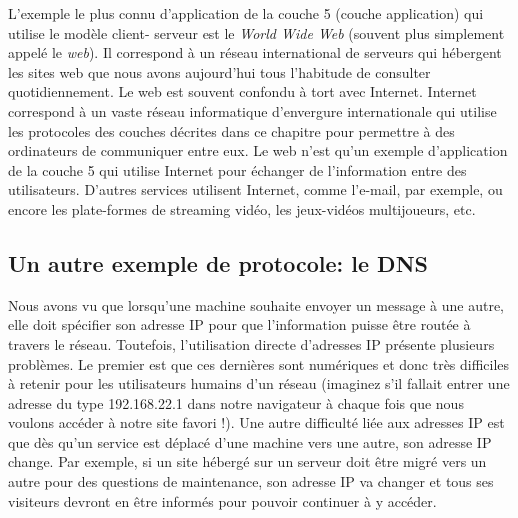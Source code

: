 \documentclass[11pt, a4paper]{book}
\begin{document}
\vskip1cm

L'exemple le plus connu d'application de la couche 5 (couche application) qui utilise le modèle client-
serveur est le {\it World Wide Web} (souvent plus simplement appelé le {\it web}). Il correspond à un réseau international de serveurs qui hébergent les sites web que nous avons aujourd'hui tous l'habitude de consulter quotidiennement. Le web est souvent confondu à tort avec Internet. Internet correspond à un vaste réseau informatique d'envergure internationale qui utilise les protocoles des couches décrites dans ce chapitre pour permettre à des ordinateurs de communiquer entre eux. Le web n'est qu'un exemple d'application de la couche 5 qui utilise Internet pour échanger de l'information entre des utilisateurs. D'autres services utilisent Internet, comme l'e-mail, par exemple, ou encore les plate-formes de streaming vidéo, les jeux-vidéos multijoueurs, etc.



\subsection{Un  autre exemple de protocole: le DNS}


Nous avons vu que lorsqu'une machine souhaite envoyer un message à une autre, elle doit spécifier son adresse IP pour que l'information puisse être routée à travers le réseau. Toutefois, l'utilisation directe d'adresses IP présente plusieurs problèmes. Le premier est que ces dernières sont numériques et donc très difficiles à retenir pour les utilisateurs humains d'un réseau (imaginez s'il fallait entrer une adresse du type 192.168.22.1 dans notre navigateur à chaque fois que nous voulons accéder à notre site favori !). Une autre difficulté liée aux adresses IP est que dès qu'un service est déplacé d'une machine vers une autre, son adresse IP change. Par exemple, si un site hébergé sur un serveur doit être migré vers un autre pour des questions de maintenance, son adresse IP va changer et tous ses visiteurs devront en être informés pour pouvoir continuer à y accéder.
\end{document}
